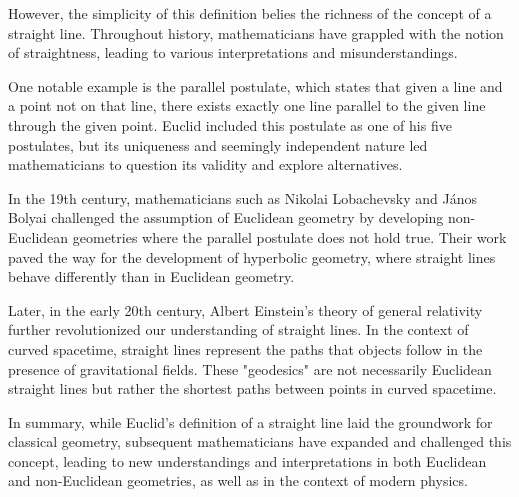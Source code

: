 However, the simplicity of this definition belies the richness of the concept of a straight line. Throughout history, mathematicians have grappled with the notion of straightness, leading to various interpretations and misunderstandings.

One notable example is the parallel postulate, which states that given a line and a point not on that line, there exists exactly one line parallel to the given line through the given point. Euclid included this postulate as one of his five postulates, but its uniqueness and seemingly independent nature led mathematicians to question its validity and explore alternatives.

In the 19th century, mathematicians such as Nikolai Lobachevsky and János Bolyai challenged the assumption of Euclidean geometry by developing non-Euclidean geometries where the parallel postulate does not hold true. Their work paved the way for the development of hyperbolic geometry, where straight lines behave differently than in Euclidean geometry.

Later, in the early 20th century, Albert Einstein's theory of general relativity further revolutionized our understanding of straight lines. In the context of curved spacetime, straight lines represent the paths that objects follow in the presence of gravitational fields. These "geodesics" are not necessarily Euclidean straight lines but rather the shortest paths between points in curved spacetime.

In summary, while Euclid's definition of a straight line laid the groundwork for classical geometry, subsequent mathematicians have expanded and challenged this concept, leading to new understandings and interpretations in both Euclidean and non-Euclidean geometries, as well as in the context of modern physics.

\clearpage
